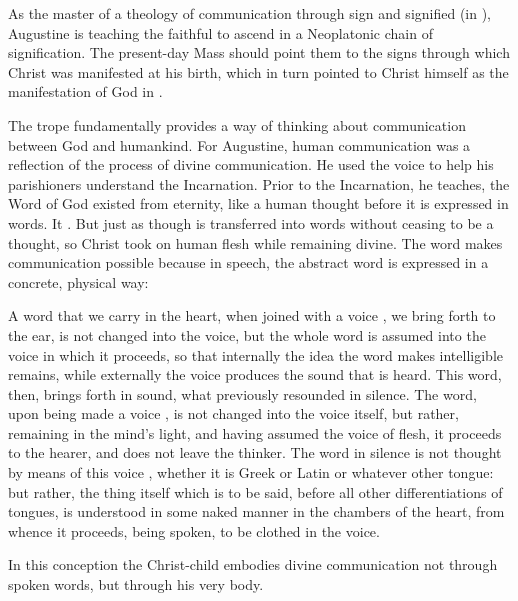As the master of a theology of communication through sign and signified (in
), Augustine is teaching the faithful to ascend in
a Neoplatonic chain of signification.
The present-day Mass should point them to the signs through which Christ was
manifested at his birth, which in turn pointed to Christ himself as the
manifestation of God in .


The  trope fundamentally provides a way of thinking about
communication between God and humankind.
For Augustine, human communication was a reflection of the process of divine
communication. 
He used the voice to help his parishioners understand the Incarnation.
Prior to the Incarnation, he teaches, the Word of God existed from eternity,
like a human thought before it is expressed in words.
It .%
    \Autocite[1001, Sermo 187, In Natali Domini 4]{Augustine:SermonesPL}
But just as though is transferred into words without ceasing to be a thought,
so Christ took on human flesh while remaining divine.
The word makes communication possible because in speech, the abstract word is
expressed in a concrete, physical way:
\begin{quoting}
    A word  that we carry in the heart, when
    joined with a voice , we bring
    forth to the ear, is not changed into the voice, but the whole word is
    assumed into the voice in which it proceeds, so that internally the idea the
    word makes intelligible remains, while externally the voice produces the
    sound that is heard.
    This word, then, brings forth in sound, what previously resounded in
    silence.  The word, upon being made a voice , is
    not changed into the voice itself, but rather, remaining in the mind's
    light, and having assumed the voice  of flesh, it proceeds to
    the hearer, and does not leave the thinker.
    The word in silence is not thought by means of this voice ,
    whether it is Greek or Latin or whatever other tongue: but rather, the thing
    itself which is to be said, before all other differentiations of tongues, is
    understood in some naked manner in the chambers of the heart, from whence it
    proceeds, being spoken, to be clothed in the voice.%
    \Autocites
    [1002, Sermo 187, In Natali Domini 4]{Augustine:SermonesPL}
    [on Christ as , see][872--889]{Lapide:Gospels19C}
\end{quoting}
In this conception the Christ-child embodies divine communication not through
spoken words, but through his very body.

